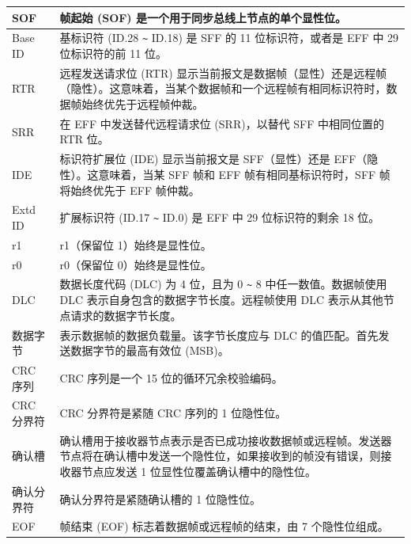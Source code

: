 \begin{longtable}[c]{|p{3.5cm}|p{12cm}|}
    SOF & 帧起始 (SOF) 是一个用于同步总线上节点的单个显性位。
          \\\hline
    Base ID & 基标识符 (ID.28 \verb+~+ ID.18) 是 SFF 的 11 位标识符，或者是 EFF 中 29 位标识符的前 11 位。
          \\\hline
   \label{table_item:canframe_rtr}RTR & 远程发送请求位 (RTR) 显示当前报文是数据帧（显性）还是远程帧（隐性）。这意味着，当某个数据帧和一个远程帧有相同标识符时，数据帧始终优先于远程帧仲裁。                                                    \\\hline
   \label{table_item:canframe_srr}SRR & 在 EFF 中发送替代远程请求位 (SRR)，以替代 SFF 中相同位置的 RTR 位。                       
           \\\hline
    IDE & 标识符扩展位 (IDE) 显示当前报文是 SFF（显性）还是 EFF（隐性）。这意味着，当某 SFF 帧和 EFF 帧有相同基标识符时，SFF 帧将始终优先于 EFF 帧仲裁。              \\\hline
    Extd ID & 扩展标识符 (ID.17 \verb+~+ ID.0) 是 EFF 中 29 位标识符的剩余 18 位。                                     \\\hline
    r1 & r1（保留位 1）始终是显性位。
             \\\hline 
    r0 & r0（保留位 0）始终是显性位。
             \\\hline
    DLC & 数据长度代码 (DLC) 为 4 位，且为 0 \verb+~+ 8 中任一数值。数据帧使用 DLC 表示自身包含的数据字节长度。远程帧使用 DLC 表示从其他节点请求的数据字节长度。 
             \\\hline
    数据字节 & 表示数据帧的数据负载量。该字节长度应与 DLC 的值匹配。首先发送数据字节的最高有效位 (MSB)。
             \\\hline
    CRC 序列 & CRC 序列是一个 15 位的循环冗余校验编码。
             \\\hline
    CRC 分界符 & CRC 分界符是紧随 CRC 序列的 1 位隐性位。
              \\\hline
    确认槽 & 确认槽用于接收器节点表示是否已成功接收数据帧或远程帧。发送器节点将在确认槽中发送一个隐性位，如果接收到的帧没有错误，则接收器节点应发送 1 位显性位覆盖确认槽中的隐性位。
              \\\hline
    确认分界符 & 确认分界符是紧随确认槽的 1 位隐性位。
              \\\hline
    EOF & 帧结束 (EOF) 标志着数据帧或远程帧的结束，由 7 个隐性位组成。
              \\\hline
\end{longtable}